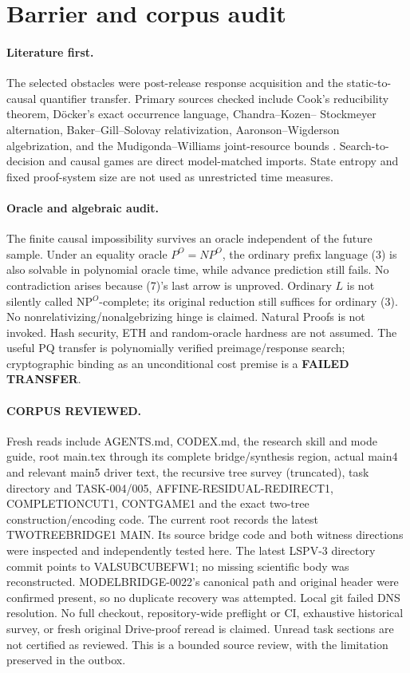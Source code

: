 \documentclass[11pt]{article}
\begin{document}
\section{Barrier and corpus audit}
\paragraph{Literature first.}
The selected obstacles were post-release response acquisition and the
static-to-causal quantifier transfer. Primary sources checked include Cook's
reducibility theorem, D\"ocker's exact occurrence language, Chandra--Kozen--
Stockmeyer alternation, Baker--Gill--Solovay relativization, Aaronson--Wigderson
algebrization, and the Mudigonda--Williams joint-resource bounds
\cite{cook,docker,cks,bgs,aw,mw}. Search-to-decision and causal games are direct
model-matched imports. State entropy and fixed proof-system size are not used
as unrestricted time measures.

\paragraph{Oracle and algebraic audit.}
The finite causal impossibility survives an oracle independent of the future
sample. Under an equality oracle $P^O=NP^O$, the ordinary prefix language
(3) is also solvable in polynomial oracle time, while advance prediction
still fails. No contradiction arises because (7)'s last arrow is unproved.
Ordinary $L$ is not silently called NP$^O$-complete; its original reduction
still suffices for ordinary (3). No nonrelativizing/nonalgebrizing hinge is
claimed. Natural Proofs is not invoked. Hash security, ETH and random-oracle
hardness are not assumed. The useful PQ transfer is polynomially verified
preimage/response search; cryptographic binding as an unconditional cost
premise is a \textbf{FAILED TRANSFER}.

\paragraph{CORPUS REVIEWED.}
Fresh reads include AGENTS.md, CODEX.md, the research skill and mode guide,
root main.tex through its complete bridge/synthesis region, actual main4
and relevant main5 driver text, the recursive tree survey (truncated), task
directory and TASK-004/005, AFFINE-RESIDUAL-REDIRECT1, COMPLETIONCUT1,
CONTGAME1 and the exact two-tree construction/encoding code. The current root
records the latest TWOTREEBRIDGE1 MAIN. Its source bridge code and both
witness directions were inspected and independently tested here. The latest
LSPV-3 directory commit points to VALSUBCUBEFW1; no missing scientific body
was reconstructed. MODELBRIDGE-0022's canonical path and original header
were confirmed present, so no duplicate recovery was attempted.
Local git failed DNS resolution. No full checkout, repository-wide preflight
or CI, exhaustive historical survey, or fresh original Drive-proof reread
is claimed. Unread task sections are not certified as reviewed. This is a
bounded source review, with the limitation preserved in the outbox.
\end{document}
